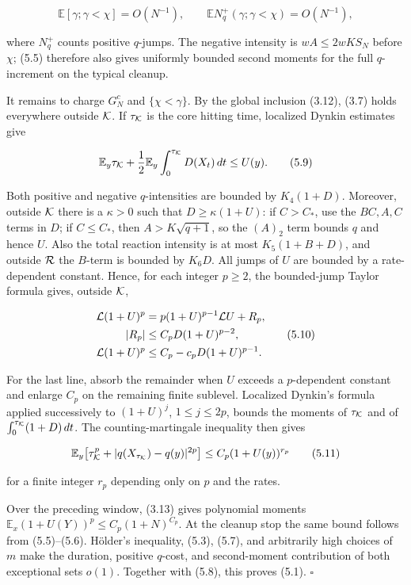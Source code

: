 \[
 \mathbb E[\gamma;\gamma<\chi]=O(N^{-1}),\qquad
 \mathbb E N_q^+(\gamma;\gamma<\chi)=O(N^{-1}),            \tag{5.8}
\]

where \(N_q^+\) counts positive \(q\)-jumps. The negative intensity is
\(wA\le 2wKS_N\) before \(\chi\); (5.5) therefore also gives uniformly
bounded second moments for the full \(q\)-increment on the typical
cleanup.

It remains to charge \(G_N^c\) and \(\{\chi<\gamma\}\). By the global
inclusion (3.12), (3.7) holds everywhere outside \({\cal K}\). If
\(\tau_{\cal K}\) is the core hitting time, localized Dynkin estimates
give

\[
 \mathbb E_y\tau_{\cal K}
 +{1\over2}\mathbb E_y\int_0^{\tau_{\cal K}}D(X_t)\,dt
 \le U(y).                                                 \tag{5.9}
\]

Both positive and negative \(q\)-intensities are bounded by
\(K_4(1+D)\). Moreover, outside \({\cal K}\) there is a \(\kappa>0\)
such that \(D\ge\kappa(1+U)\): if \(C>C_*\), use the \(BC,A,C\) terms in
\(D\); if \(C\le C_*\), then \(A>K\sqrt{q+1}\), so the \((A)_2\) term
bounds \(q\) and hence \(U\). Also the total reaction intensity is at
most \(K_5(1+B+D)\), and outside \({\cal R}\) the \(B\)-term is bounded
by \(K_6D\). All jumps of \(U\) are bounded by a rate-dependent
constant. Hence, for each integer \(p\ge2\), the bounded-jump Taylor
formula gives, outside \({\cal K}\),

\[
\begin{split}
 {\cal L}(1+U)^p
 &=p(1+U)^{p-1}{\cal L}U+R_p,\\
 |R_p|&\le C_pD(1+U)^{p-2},\\
 {\cal L}(1+U)^p
 &\le C_p-c_pD(1+U)^{p-1}.
\end{split}\tag{5.10}
\]

For the last line, absorb the remainder when \(U\) exceeds a
\(p\)-dependent constant and enlarge \(C_p\) on the remaining finite
sublevel. Localized Dynkin's formula applied successively to
\((1+U)^j\), \(1\le j\le2p\), bounds the moments of \(\tau_{\cal K}\)
and of \(\int_0^{\tau_{\cal K}}(1+D)\,dt\). The counting-martingale
inequality then gives

\[
 \mathbb E_y\!\left[
 \tau_{\cal K}^p+
 |q(X_{\tau_{\cal K}})-q(y)|^{2p}\right]
 \le C_p(1+U(y))^{r_p}                                    \tag{5.11}
\]

for a finite integer \(r_p\) depending only on \(p\) and the rates.

Over the preceding window, (3.13) gives polynomial moments
\(\mathbb E_x(1+U(Y))^p\le C_p(1+N)^{C_p}\). At the cleanup stop the
same bound follows from (5.5)--(5.6). Hölder's inequality, (5.3), (5.7),
and arbitrarily high choices of \(m\) make the duration, positive
\(q\)-cost, and second-moment contribution of both exceptional sets
\(o(1)\). Together with (5.8), this proves (5.1). \(\square\)

